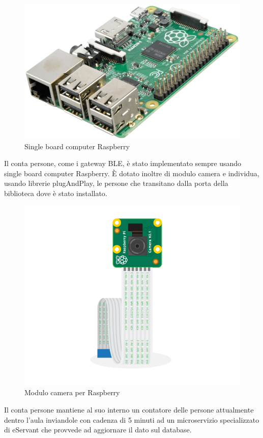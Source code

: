 \begin{figure}[H]
    \centering  
    \caption{Single board computer Raspberry}
    \includegraphics[scale=0.2]{img/cap4/raspberry}
\end{figure}


Il conta persone, come i gateway BLE, è stato implementato sempre usando single board computer
Raspberry.
È dotato inoltre di modulo camera e individua, usando librerie plugAndPlay, le persone che transitano 
dalla porta della biblioteca dove è stato installato.

\begin{figure}[H]
    \centering  
    \caption{Modulo camera per Raspberry}
    \includegraphics[scale=0.2]{img/cap4/camera}
\end{figure}

Il conta persone mantiene al suo interno un contatore delle persone attualmente dentro l'aula
inviandole con cadenza di 5 minuti ad un microservizio specializzato di eServant che provvede ad
aggiornare il dato sul database.
